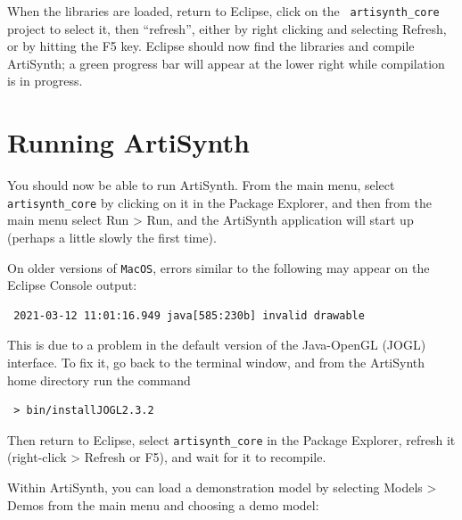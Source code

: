When the libraries are loaded, return to Eclipse, click on the {\tt
artisynth\_core} project to select it, then ``refresh'', either by
right clicking and selecting {\sf Refresh}, or by hitting the {\sf F5}
key. Eclipse should now find the libraries and compile ArtiSynth; a
green progress bar will appear at the lower right while compilation is
in progress.

\section{Running ArtiSynth}

You should now be able to run ArtiSynth. From the main menu, select
{\tt artisynth\_core} by clicking on it in the Package Explorer, and
then from the main menu select {\sf Run > Run}, and the ArtiSynth
application will start up (perhaps a little slowly the first time).
\ifMacOS

\begin{sideblock}
On older versions of {\tt MacOS}, errors similar to the following
may appear on the Eclipse Console output:
\begin{verbatim}
 2021-03-12 11:01:16.949 java[585:230b] invalid drawable 
\end{verbatim}
This is due to a problem in the default version of the Java-OpenGL
(JOGL) interface. To fix it, go back to the terminal window, and
from the ArtiSynth home directory run the command
\begin{verbatim}
 > bin/installJOGL2.3.2
\end{verbatim}
Then return to Eclipse, select {\tt artisynth\_core} in the Package
Explorer, refresh it (right-click > {\sf Refresh} or {\sf F5}), and
wait for it to recompile.
\end{sideblock}

\fi
Within ArtiSynth, you can load a demonstration model by selecting
{\sf Models > Demos} from the main menu and choosing a demo model:

